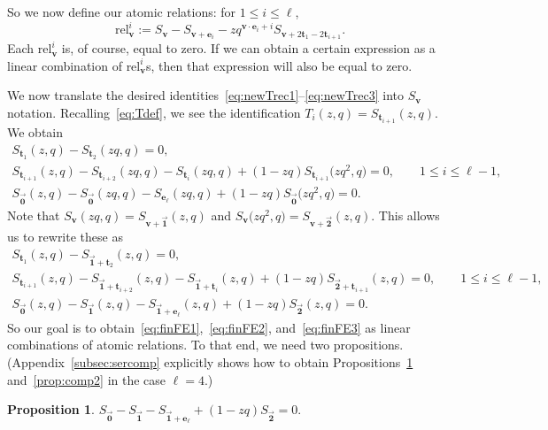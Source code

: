 \documentclass[10pt,a4paper]{amsart}
\numberwithin{equation}{section}
\newtheorem{Proposition}[Theorem]{Proposition}
\theoremstyle{definition}
\newcommand{\rel}{\text{rel}}
\newcommand{\tr}{\mathbf{t}}
\newcommand{\vv}{\mathbf{v}}
\newcommand{\ee}{\mathbf{e}}
\newcommand{\two}{\vec{\mathbf{2}}}
\newcommand{\one}{\vec{\mathbf{1}}}
\newcommand{\zero}{\vec{\mathbf{0}}}
\begin{document}
So we now define our atomic relations: for $1\le i \le \ell$,
\begin{equation*}
\rel^i_\vv:=S_\vv - S_{\vv+\ee_i} - zq^{\vv\cdot\ee_i+i} S_{\vv+2\tr_1-2\tr_{i+1}}.
\end{equation*}
Each $\rel^i_\vv$ is, of course, equal to zero. If we can obtain a certain expression as a linear combination of $\rel^i_\vv$s, then that expression will also be equal to zero.

We now translate the desired identities~\eqref{eq:newTrec1}--\eqref{eq:newTrec3} into $S_\vv$ notation. Recalling~\eqref{eq:Tdef}, we see the identification $T_i(z,q) = S_{\tr_{i+1}}(z,q).$ We obtain
\begin{gather*}
S_{\tr_1}(z,q)-S_{\tr_2}(zq,q) =0, \\
S_{\tr_{i+1}}(z,q) - S_{\tr_{i+2}}(zq,q) - S_{\tr_{i}}(zq,q) + (1-zq)S_{\tr_{i+1}}\bigl(zq^2,q\bigr) =0, \qquad 1 \le i \le \ell-1, \\
S_{\zero}(z,q) - S_{\zero}(zq,q) -S_{\ee_\ell}(zq,q) + (1-zq) S_{\zero}\bigl(zq^2,q\bigr) = 0.
\end{gather*}
Note that $S_\vv(zq,q) = S_{\vv+\one} (z,q)$ and $S_\vv\bigl(zq^2,q\bigr) = S_{\vv+\two} (z,q)$. This allows us to rewrite these as
\begin{gather}
S_{\tr_1}(z,q)-S_{\one+\tr_2}(z,q) =0, \label{eq:finFE1} \\
S_{\tr_{i+1}}(z,q) - S_{\one+\tr_{i+2}}(z,q) - S_{\one+\tr_{i}}(z,q) + (1-zq)S_{\two+\tr_{i+1}}(z,q) =0, \qquad\! 1 \le i \le \ell-1,\!\!\! \label{eq:finFE2} \\
S_{\zero}(z,q) - S_{\one}(z,q) -S_{\one+\ee_\ell}(z,q) + (1-zq) S_{\two}(z,q) = 0. \label{eq:finFE3}
\end{gather}
So our goal is to obtain~\eqref{eq:finFE1},~\eqref{eq:finFE2}, and~\eqref{eq:finFE3} as linear combinations of atomic relations. To that end, we need two propositions. (Appendix~\ref{subsec:sercomp} explicitly shows how to obtain Propositions~\ref{prop:comp1} and~\ref{prop:comp2} in the case $\ell=4$.)
\begin{Proposition} \label{prop:comp1}
$S_{\zero} - S_{\one} -
S_{\one+\ee_\ell} + (1-zq) S_{\two}=0.$
\end{Proposition}
\end{document}
